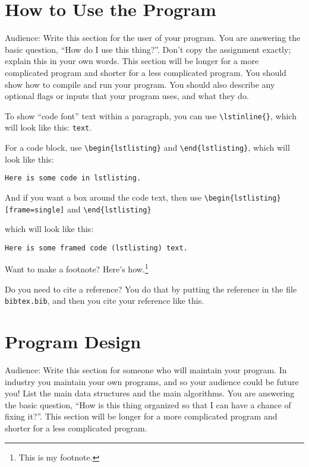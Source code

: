 \documentclass{article}
\begin{document}
\section*{How to Use the Program}

Audience: Write this section for the user
of your program. You are answering the
basic question, ``How do I use this
thing?''. Don't copy the assignment
exactly; explain this in your own
words.
This section will be longer for a more 
complicated program and shorter for a
less complicated program.
You should show how to compile and run your program. 
You should also describe any optional flags or inputs that
your program uses, and what they do. 

To show ``code font'' text within a paragraph,
you can use \lstinline|\lstinline{}|,
which will look like this: \lstinline|text|.


For a code block,
use \lstinline|\begin{lstlisting}| and
\lstinline|\end{lstlisting}|,
which will look like this:

\begin{lstlisting}
Here is some code in lstlisting.
\end{lstlisting}

And if you want a box around the code
text, then 
use \lstinline|\begin{lstlisting}[frame=single]| and
\lstinline|\end{lstlisting}|

which will look like this:

\begin{lstlisting}[frame=single]
Here is some framed code (lstlisting) text.
\end{lstlisting}

Want to make a footnote?
Here's how.\footnote{This is my footnote.}

Do you need to cite a reference?
You do that by putting the reference
in the file \lstinline|bibtex.bib|,
and then you cite your reference like
this\cite{wiki:C}\cite{Mecklenburg:2005a}\cite{Tschinkel:2007a}.

\section*{Program Design}

Audience: Write this section for someone
who will maintain your program.
In industry you maintain your own
programs, and so your audience could be
future you! List
the main data structures and the main
algorithms. You are answering the basic
question, ``How is this thing organized
so that I can have a chance of fixing
it?''. This section will be longer for a
more complicated program and shorter for
a less complicated program.
\end{document}
